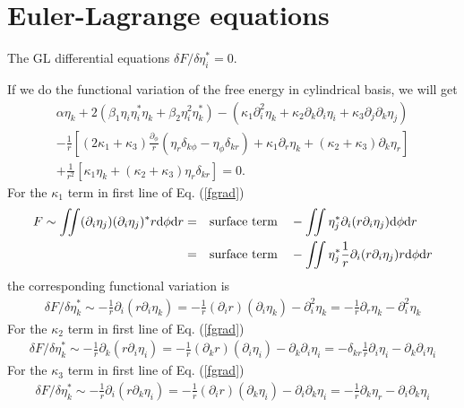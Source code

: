 \documentclass[aps,prl,preprint]{revtex4-2}
\begin{document}
\section{Euler-Lagrange equations}

The GL differential equations $\delta F/\delta\eta_i^*=0$.

If we do the functional variation of the free energy in cylindrical basis, we will get
\begin{align}
    \alpha\eta_k+2(\beta_1\eta_i\eta_i^*\eta_k
    +\beta_2\eta_i^2\eta_k^*)-\left(\kappa_1\partial_i^2\eta_k
    +\kappa_2\partial_k\partial_i\eta_i
    +\kappa_3\partial_j\partial_k\eta_j\right)\nonumber\\
    -\frac{1}{r}\left[(2\kappa_1+\kappa_3)\frac{\partial_\phi}{r}
    \left(\eta_r\delta_{k\phi}-\eta_\phi\delta_{kr}\right)+\kappa_1\partial_r\eta_k
    +(\kappa_2+\kappa_3)\partial_k\eta_r\right]\nonumber\\
    +\frac{1}{r^2}[\kappa_1\eta_k+(\kappa_2+\kappa_3)\eta_r\delta_{kr}]
    =0.
\end{align}
For the $\kappa_1$ term in first line of Eq. (\ref{fgrad})
\begin{align}
    F\sim\iint (\partial_i\eta_j)(\partial_i\eta_j)^* r\dd\phi\dd r
    =&\qq{surface term} - \iint \eta_j^*\partial_i(r\partial_i\eta_j) \dd\phi\dd r\\
    =&\qq{surface term} - \iint \eta_j^*\frac{1}{r}\partial_i(r\partial_i\eta_j) r\dd\phi\dd r
\end{align}
the corresponding functional variation is
\begin{align}
    \delta F/\delta\eta_k^*\sim-\frac{1}{r}\partial_i(r\partial_i\eta_k)
    =-\frac{1}{r}(\partial_i r)(\partial_i\eta_k)-\partial_i^2\eta_k
    =-\frac{1}{r}\partial_r\eta_k - \partial_i^2\eta_k
\end{align}
For the $\kappa_2$ term in first line of Eq. (\ref{fgrad})
\begin{align}
    \delta F/\delta\eta_k^*\sim-\frac{1}{r}\partial_k(r\partial_i\eta_i)
    =-\frac{1}{r}(\partial_k r)(\partial_i\eta_i)-\partial_k\partial_i\eta_i
    =-\delta_{kr}\frac{1}{r}\partial_i\eta_i - \partial_k\partial_i\eta_i
\end{align}
For the $\kappa_3$ term in first line of Eq. (\ref{fgrad})
\begin{align}
    \delta F/\delta\eta_k^*\sim-\frac{1}{r}\partial_i(r\partial_k\eta_i)
    =-\frac{1}{r}(\partial_i r)(\partial_k\eta_i)-\partial_i\partial_k\eta_i
    =-\frac{1}{r}\partial_k\eta_r - \partial_i\partial_k\eta_i
\end{align}
\end{document}
